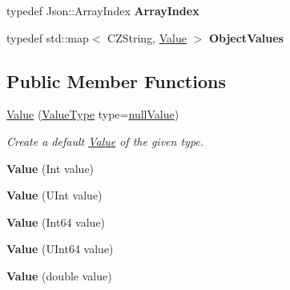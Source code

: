 \begin{DoxyCompactItemize}
\item 
typedef Json\+::\+Array\+Index {\bfseries Array\+Index}\hypertarget{classJson_1_1Value_a184a91566cccca7b819240f0d5561c7d}{}\label{classJson_1_1Value_a184a91566cccca7b819240f0d5561c7d}

\item 
typedef std\+::map$<$ C\+Z\+String, \hyperlink{classJson_1_1Value}{Value} $>$ {\bfseries Object\+Values}\hypertarget{classJson_1_1Value_a08b6c80c3af7071d908dabf044de5388}{}\label{classJson_1_1Value_a08b6c80c3af7071d908dabf044de5388}

\end{DoxyCompactItemize}
\subsection*{Public Member Functions}
\begin{DoxyCompactItemize}
\item 
\hyperlink{classJson_1_1Value_ada6ba1369448fb0240bccc36efaa46f7}{Value} (\hyperlink{namespaceJson_a7d654b75c16a57007925868e38212b4e}{Value\+Type} type=\hyperlink{namespaceJson_a7d654b75c16a57007925868e38212b4ea7d9899633b4409bd3fc107e6737f8391}{null\+Value})
\begin{DoxyCompactList}\small\item\em Create a default \hyperlink{classJson_1_1Value}{Value} of the given type. \end{DoxyCompactList}\item 
{\bfseries Value} (Int value)\hypertarget{classJson_1_1Value_a4744ae571fcf34f4b16a2257b3b3b585}{}\label{classJson_1_1Value_a4744ae571fcf34f4b16a2257b3b3b585}

\item 
{\bfseries Value} (U\+Int value)\hypertarget{classJson_1_1Value_ae67a857b01286e3499a87e95be848d20}{}\label{classJson_1_1Value_ae67a857b01286e3499a87e95be848d20}

\item 
{\bfseries Value} (Int64 value)\hypertarget{classJson_1_1Value_ab1cdc3d9a4d4cc03fa01439d43ceb1b5}{}\label{classJson_1_1Value_ab1cdc3d9a4d4cc03fa01439d43ceb1b5}

\item 
{\bfseries Value} (U\+Int64 value)\hypertarget{classJson_1_1Value_a8adda58d5ae17bf7ca6a53bab4a7b69c}{}\label{classJson_1_1Value_a8adda58d5ae17bf7ca6a53bab4a7b69c}

\item 
{\bfseries Value} (double value)\hypertarget{classJson_1_1Value_a32228cc84d83200cca8441451997996c}{}\label{classJson_1_1Value_a32228cc84d83200cca8441451997996c}


\end{DoxyCompactItemize}
